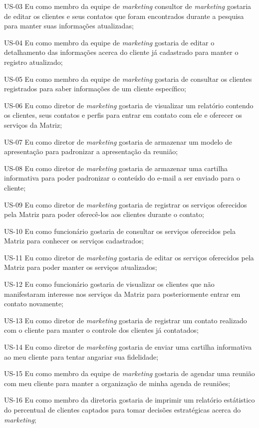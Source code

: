 US-03 Eu como membro da equipe de \textit{marketing} consultor de \textit{marketing} gostaria de editar os clientes e seus contatos que foram encontrados durante a pesquisa para manter suas informações atualizadas;


US-04 Eu como membro da equipe de \textit{marketing} gostaria de editar o detalhamento das informações acerca do cliente já cadastrado para manter o registro atualizado;


US-05 Eu como membro da equipe de \textit{marketing} gostaria de consultar os clientes registrados para saber informações de um cliente específico;


US-06 Eu como diretor de \textit{marketing} gostaria de visualizar um relatório contendo os clientes, seus contatos e perfis para entrar em contato com ele e oferecer os serviços da Matriz;


US-07 Eu como diretor de \textit{marketing} gostaria de armazenar um modelo de apresentação para padronizar a apresentação da reunião;


US-08 Eu como diretor de \textit{marketing} gostaria de armazenar uma cartilha informativa para poder padronizar o conteúdo do e-mail a ser enviado para o cliente;


US-09 Eu como diretor de \textit{marketing} gostaria de registrar os serviços oferecidos pela Matriz para poder oferecê-los aos clientes durante o contato;


US-10 Eu como funcionário gostaria de consultar os serviços oferecidos pela Matriz para conhecer os serviços cadastrados;


US-11 Eu como diretor de \textit{marketing} gostaria de editar os serviços oferecidos pela Matriz para poder manter os serviços atualizados;


US-12 Eu como funcionário gostaria de visualizar os clientes que não manifestaram interesse nos serviços da Matriz para posteriormente entrar em contato novamente;


US-13 Eu como diretor de \textit{marketing} gostaria de registrar um contato realizado com o cliente para manter o controle dos clientes já contatados;


US-14 Eu como diretor de \textit{marketing} gostaria de enviar uma cartilha informativa ao meu cliente para tentar angariar sua fidelidade;


US-15 Eu como membro da equipe de \textit{marketing} gostaria de agendar uma reunião com meu cliente para manter a organização de minha agenda de reuniões;


US-16 Eu como membro da diretoria gostaria de imprimir um relatório estátistico do percentual de clientes captados para tomar decisões estratégicas acerca do \textit{marketing};


